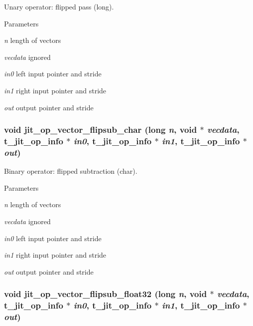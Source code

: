 Unary operator: flipped pass (long). 
\begin{DoxyParams}{Parameters}
\item[{\em n}]length of vectors \item[{\em vecdata}]ignored \item[{\em in0}]left input pointer and stride \item[{\em in1}]right input pointer and stride \item[{\em out}]output pointer and stride \end{DoxyParams}
\hypertarget{group__opvecmod_ga609e019f00f9ddd83a91a9bfbf0bf78e}{
\subsubsection[{jit\_\-op\_\-vector\_\-flipsub\_\-char}]{\setlength{\rightskip}{0pt plus 5cm}void jit\_\-op\_\-vector\_\-flipsub\_\-char (long {\em n}, \/  void $\ast$ {\em vecdata}, \/  {\bf t\_\-jit\_\-op\_\-info} $\ast$ {\em in0}, \/  {\bf t\_\-jit\_\-op\_\-info} $\ast$ {\em in1}, \/  {\bf t\_\-jit\_\-op\_\-info} $\ast$ {\em out})}}
\label{group__opvecmod_ga609e019f00f9ddd83a91a9bfbf0bf78e}


Binary operator: flipped subtraction (char). 
\begin{DoxyParams}{Parameters}
\item[{\em n}]length of vectors \item[{\em vecdata}]ignored \item[{\em in0}]left input pointer and stride \item[{\em in1}]right input pointer and stride \item[{\em out}]output pointer and stride \end{DoxyParams}
\hypertarget{group__opvecmod_gad3182b8739f7c992998de4c6ed76fc54}{
\subsubsection[{jit\_\-op\_\-vector\_\-flipsub\_\-float32}]{\setlength{\rightskip}{0pt plus 5cm}void jit\_\-op\_\-vector\_\-flipsub\_\-float32 (long {\em n}, \/  void $\ast$ {\em vecdata}, \/  {\bf t\_\-jit\_\-op\_\-info} $\ast$ {\em in0}, \/  {\bf t\_\-jit\_\-op\_\-info} $\ast$ {\em in1}, \/  {\bf t\_\-jit\_\-op\_\-info} $\ast$ {\em out})}}
\label{group__opvecmod_gad3182b8739f7c992998de4c6ed76fc54}


